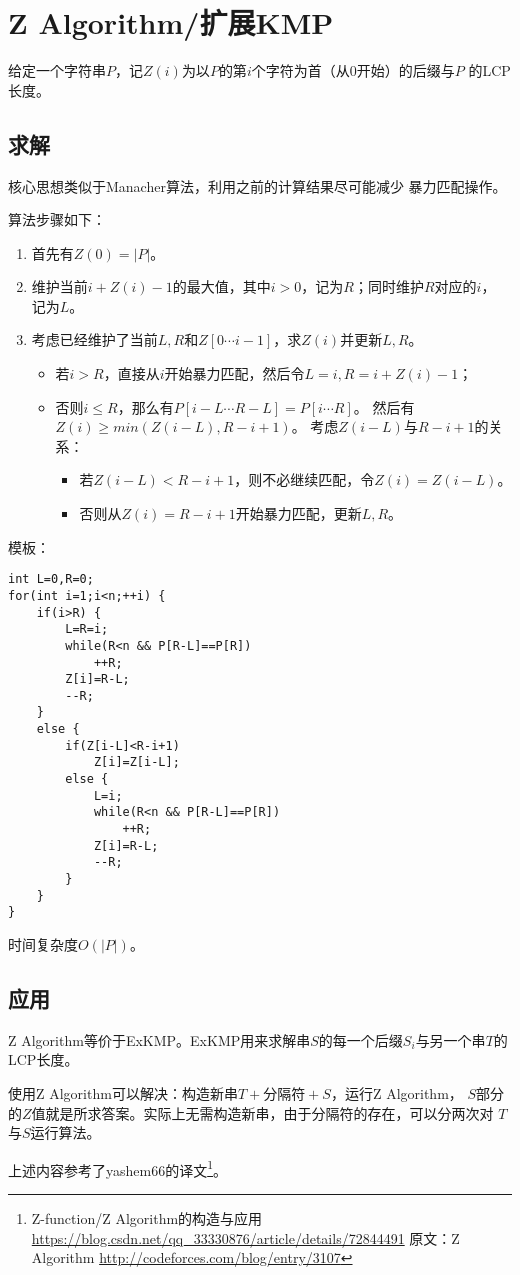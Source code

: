 \section{Z Algorithm/扩展KMP}
给定一个字符串$P$，记$Z(i)$为以$P$的第$i$个字符为首（从0开始）的后缀与$P$
的LCP长度。
\subsection{求解}
核心思想类似于Manacher算法，利用之前的计算结果尽可能减少
暴力匹配操作。

算法步骤如下：
\begin{enumerate}
    \item 首先有$Z(0)=|P|$。
    \item 维护当前$i+Z(i)-1$的最大值，其中$i>0$，记为$R$；同时维护$R$对应的$i$，
    记为$L$。
    \item 考虑已经维护了当前$L,R$和$Z[0\cdots i-1]$，求$Z(i)$并更新$L,R$。
    \begin{itemize}
        \item 若$i>R$，直接从$i$开始暴力匹配，然后令$L=i,R=i+Z(i)-1$；
        \item 否则$i\leq R$，那么有$P[i-L\cdots R-L]=P[i\cdots R]$。
        然后有$Z(i)\geq min(Z(i-L),R-i+1)$。
        考虑$Z(i-L)$与$R-i+1$的关系：
        \begin{itemize}
            \item 若$Z(i-L)<R-i+1$，则不必继续匹配，令$Z(i)=Z(i-L)$。
            \item 否则从$Z(i)=R-i+1$开始暴力匹配，更新$L,R$。
        \end{itemize}
    \end{itemize}
\end{enumerate}

模板：
\begin{lstlisting}
int L=0,R=0;
for(int i=1;i<n;++i) {
    if(i>R) {
        L=R=i;
        while(R<n && P[R-L]==P[R])
            ++R;
        Z[i]=R-L;
        --R;
    }
    else {
        if(Z[i-L]<R-i+1)
            Z[i]=Z[i-L];
        else {
            L=i;
            while(R<n && P[R-L]==P[R])
                ++R;
            Z[i]=R-L;
            --R;
        }
    }
}
\end{lstlisting}

时间复杂度$O(|P|)$。
\subsection{应用}
Z Algorithm等价于ExKMP。ExKMP用来求解串$S$的每一个后缀$S_i$与另一个串$T$的
LCP长度。

使用Z Algorithm可以解决：构造新串$T+\mathrm{分隔符}+S$，运行Z Algorithm，
$S$部分的$Z$值就是所求答案。实际上无需构造新串，由于分隔符的存在，可以分两次对
$T$与$S$运行算法。

上述内容参考了yashem66的译文\footnote{
    Z-function/Z Algorithm的构造与应用
    \url{https://blog.csdn.net/qq\_33330876/article/details/72844491}
    原文：Z Algorithm
    \url{http://codeforces.com/blog/entry/3107}
}。
